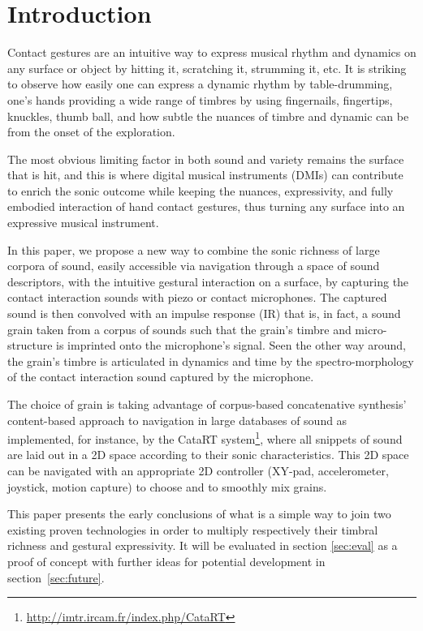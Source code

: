 \section{Introduction}


Contact gestures are an intuitive way to express musical rhythm and dynamics on any surface or object by hitting it, scratching it, strumming it, etc.  It is striking to observe how easily one can express a dynamic rhythm by table-drumming, one's hands providing a wide range of timbres by using fingernails, fingertips, knuckles, thumb ball, and how subtle the nuances of timbre and dynamic can be from the onset of the exploration.

The most obvious limiting factor in both sound and variety remains the surface that is hit, and this is where digital musical instruments (DMIs) can contribute to enrich the sonic outcome while keeping the nuances, expressivity, and fully embodied interaction of hand contact gestures, thus turning any surface into an expressive musical instrument.

In this paper, we propose a new way to combine the sonic richness of large corpora of sound, easily accessible via navigation through a space of sound descriptors, with the intuitive gestural interaction on a surface, by capturing the contact interaction sounds with piezo or contact microphones. The captured sound is then convolved with an impulse response (IR) that is, in fact, a sound grain taken from a corpus of sounds such that the grain's timbre and micro-structure is imprinted onto the microphone's signal.
Seen the other way around, the grain's timbre is articulated in dynamics and time by the spectro-morphology of the contact interaction sound captured by the microphone. 

The choice of grain is taking advantage of corpus-based concatenative synthesis' content-based approach to navigation in large databases of sound as implemented, for instance, by the CataRT system\footnote{\url{http://imtr.ircam.fr/index.php/CataRT}}, where all snippets of sound are laid out in a 2D space according to their sonic characteristics.  This 2D space can be navigated with an appropriate 2D controller (XY-pad, accelerometer, joystick, motion capture) to choose and to smoothly mix grains.

This paper presents the early conclusions of what is a simple way to join two existing proven technologies in order to multiply respectively their timbral richness and gestural expressivity. It will be evaluated in section \ref{sec:eval} as a proof of concept with further ideas for potential development in section~\ref{sec:future}.


